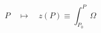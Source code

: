 \begin{equation}
  \label{eq:z}
P\quad \mapsto \quad z(P)\equiv\int_{P_0}^P \Omega \,
\end{equation}

